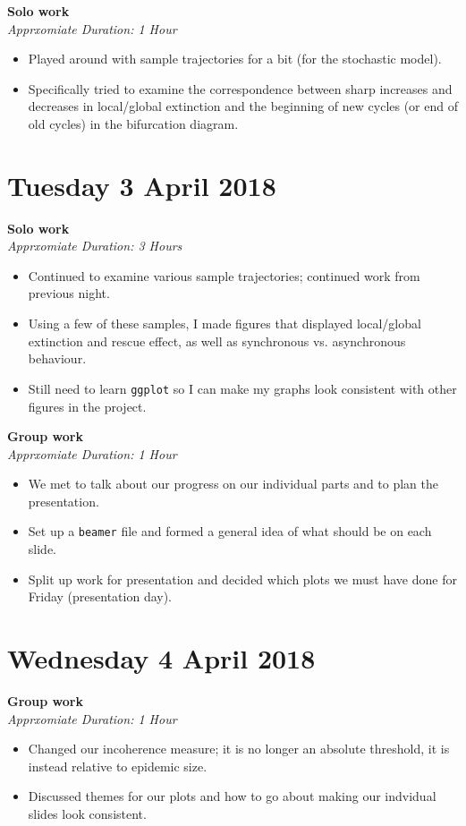 \documentclass[12pt]{article}\usepackage[]{graphicx}\usepackage[]{color}
\begin{document}
\textbf{Solo work} \\
\emph{Apprxomiate Duration: 1 Hour}
\begin{itemize}
\item Played around with sample trajectories for a bit (for the stochastic model).
\item Specifically tried to examine the correspondence between sharp increases and decreases in local/global extinction and the beginning of new cycles (or end of old cycles) in the bifurcation diagram.
\end{itemize}

\section*{Tuesday 3 April 2018}

\textbf{Solo work} \\
\emph{Apprxomiate Duration: 3 Hours}
\begin{itemize}
\item Continued to examine various sample trajectories; continued work from previous night.
\item Using a few of these samples, I made figures that displayed local/global extinction and rescue effect, as well as synchronous vs. asynchronous behaviour.
\item Still need to learn \texttt{ggplot} so I can make my graphs look consistent with other figures in the project.
\end{itemize}

\textbf{Group work} \\
\emph{Apprxomiate Duration: 1 Hour}
\begin{itemize}
\item We met to talk about our progress on our individual parts and to plan the presentation.
\item Set up a \texttt{beamer} file and formed a general idea of what should be on each slide.
\item Split up work for presentation and decided which plots we must have done for Friday (presentation day).
\end{itemize}

\section*{Wednesday 4 April 2018}

\textbf{Group work} \\
\emph{Apprxomiate Duration: 1 Hour}
\begin{itemize}
\item Changed our incoherence measure; it is no longer an absolute threshold, it is instead relative to epidemic size.
\item Discussed themes for our plots and how to go about making our indvidual slides look consistent.
\end{itemize}
\end{document}
